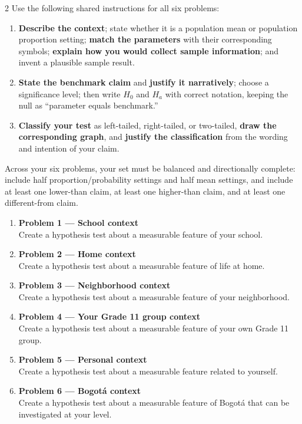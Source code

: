 \documentclass[12pt]{article}
\begin{document}
\begin{multicols}{2}
Use the following shared instructions for all six problems:
\begin{enumerate}
	\item[(C1)] \textbf{Describe the context}; state whether it is a population mean or population proportion setting; \textbf{match the parameters} with their corresponding symbols; \textbf{explain how you would collect sample information}; and invent a plausible sample result.
	\item[(C2)] \textbf{State the benchmark claim} and \textbf{justify it narratively}; choose a significance level; then write \(H_0\) and \(H_a\) with correct notation, keeping the null as ``parameter equals benchmark.''
	\item[(C3)] \textbf{Classify your test} as left-tailed, right-tailed, or two-tailed, \textbf{draw the corresponding graph}, and \textbf{justify the classification} from the wording and intention of your claim.
\end{enumerate}

Across your six problems, your set must be balanced and directionally complete: include half proportion/probability settings and half mean settings, and include at least one lower-than claim, at least one higher-than claim, and at least one different-from claim.



\begin{enumerate}
\item \textbf{Problem 1 --- School context}\\
Create a hypothesis test about a measurable feature of your school.

\item \textbf{Problem 2 --- Home context}\\
Create a hypothesis test about a measurable feature of life at home.

\item \textbf{Problem 3 --- Neighborhood context}\\
Create a hypothesis test about a measurable feature of your neighborhood.

\item \textbf{Problem 4 --- Your Grade 11 group context}\\
Create a hypothesis test about a measurable feature of your own Grade 11 group.

\item \textbf{Problem 5 --- Personal context}\\
Create a hypothesis test about a measurable feature related to yourself.

\item \textbf{Problem 6 --- Bogotá context}\\
Create a hypothesis test about a measurable feature of Bogotá that can be investigated at your level.
\end{enumerate}

\end{multicols}
\end{document}

